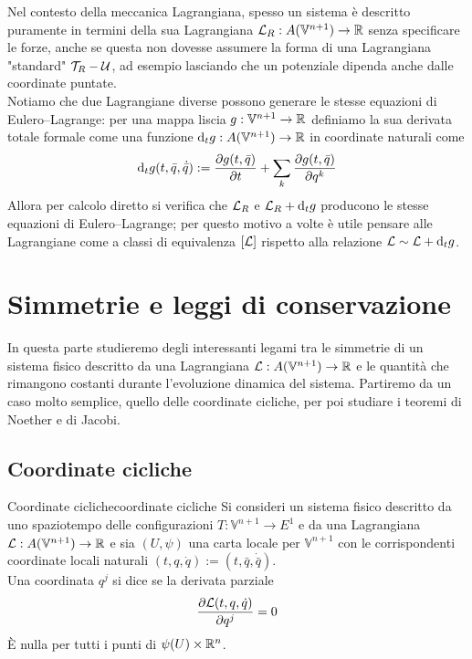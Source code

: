 \documentclass[openany]{book}
\renewcommand\V{\mathbb{V}}
\begin{document}
Nel contesto della meccanica Lagrangiana, spesso un sistema è descritto puramente in termini della sua Lagrangiana $\L_R : A(\V^{n+1})\to\R$ senza specificare le forze, anche se questa non dovesse assumere la forma di una Lagrangiana "standard" $\mathcal{T}_R -\mathcal{U}$, ad esempio lasciando che un potenziale dipenda anche dalle coordinate puntate.\\
Notiamo che due Lagrangiane diverse possono generare le stesse equazioni di Eulero--Lagrange: per una mappa liscia $g:\V^{n+1}\to\R$ definiamo la sua derivata totale formale come una funzione $\di_t g: A(\V^{n+1})\to\R$ in coordinate naturali come
\[ \text{d}_t g(t,\bar q, \dot{\bar q}) := \frac{\partial g(t,\bar q)}{\partial t} + \sum_{k} \frac{\partial g(t,\bar q)}{\partial q^k} \]
Allora per calcolo diretto si verifica che $\mathcal{L}_R$ e $\mathcal{L}_R +\text{d}_t g$ producono le stesse equazioni di Eulero--Lagrange; per questo motivo a volte è utile pensare alle Lagrangiane come a classi di equivalenza $[\mathcal{L}]$ rispetto alla relazione $\mathcal{L} \sim \mathcal{L} + \text{d}_t g$.

\chapter{Simmetrie e leggi di conservazione}

In questa parte studieremo degli interessanti legami tra le simmetrie di un sistema fisico descritto da una Lagrangiana $\L: A(\V^{n+1})\to\R$ e le quantità che rimangono costanti durante l'evoluzione dinamica del sistema. Partiremo da un caso molto semplice, quello delle coordinate cicliche, per poi studiare i teoremi di Noether e di Jacobi.

\newcommand\I{\mc I}
\section{Coordinate cicliche}

\begin{definition}{Coordinate cicliche}{coordinate cicliche}
    Si consideri un sistema fisico descritto da uno spaziotempo delle configurazioni $T:\V^{n+1}\to E^1$ e da una Lagrangiana $\L:A(\V^{n+1})\to\R$ e sia $(U,\psi)$ una carta locale per $\V^{n+1}$ con le corrispondenti coordinate locali naturali $(t, q, \dot q) := (t,\bar q, \dot{\bar q})$.\\
    Una coordinata $q^j$ si dice  se la derivata parziale 
    \[ \frac{\partial \mathcal{L}(t,q,\dot q)}{\partial q^j} = 0 \]
    È nulla per tutti i punti di $\psi(U)\times\mathbb{R}^n$.
\end{definition}
\end{document}
